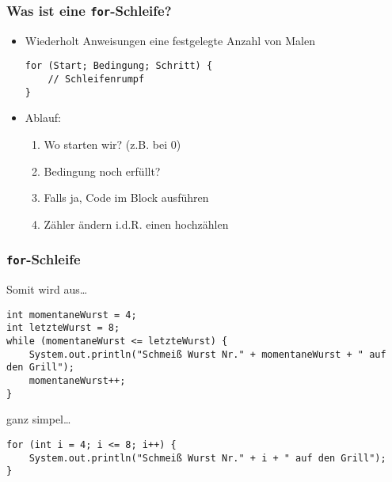 \documentclass{../../presentation}
\begin{document}
\begin{frame}[fragile]
  \frametitle{Was ist eine \texttt{for}-Schleife?}
  \pause
  \begin{itemize}
    \item Wiederholt Anweisungen eine festgelegte Anzahl von Malen
          \pause
          \begin{verbatim}
for (Start; Bedingung; Schritt) {
    // Schleifenrumpf
}
\end{verbatim}
          \pause
    \item Ablauf:
          \pause
          \begin{enumerate}
            \item Wo starten wir? (z.B. bei 0)
                  \pause
            \item Bedingung noch erfüllt?
                  \pause
            \item Falls ja, Code im Block ausführen
                  \pause
            \item Zähler ändern i.d.R. einen hochzählen
          \end{enumerate}
  \end{itemize}
\end{frame}



\begin{frame}[fragile]
  \frametitle{\texttt{for}-Schleife}
  \pause
  Somit wird aus\dots

  \begin{verbatim}
int momentaneWurst = 4;
int letzteWurst = 8;
while (momentaneWurst <= letzteWurst) {
    System.out.println("Schmeiß Wurst Nr." + momentaneWurst + " auf den Grill");
    momentaneWurst++;
}
  \end{verbatim}
  \pause
  ganz simpel\dots
  \begin{verbatim}
for (int i = 4; i <= 8; i++) {
    System.out.println("Schmeiß Wurst Nr." + i + " auf den Grill");
}
  \end{verbatim}

\end{frame}


\end{document}
